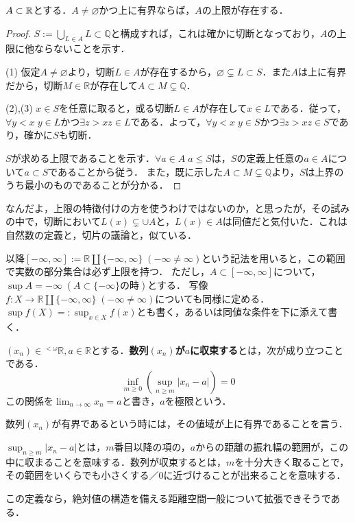 \documentclass[uplatex,dvipdfmx]{jsreport}
\begin{document}
\begin{theorem}[実数の連続性]
    $A\subset\mathbb{R}$とする．$A\ne\varnothing$かつ上に有界ならば，$A$の上限が存在する．
\end{theorem}
\begin{proof}
    $S:=\bigcup_{L\in A}L\subset\mathbb{Q}$と構成すれば，これは確かに切断となっており，$A$の上限に他ならないことを示す．

    (1) 仮定$A\ne\varnothing$より，切断$L\in A$が存在するから，$\varnothing\subsetneq L\subset S$．また$A$は上に有界だから，切断$M\in\mathbb{R}$が存在して$A\subset M\subsetneq\mathbb{Q}$．
    
    (2),(3) $x\in S$を任意に取ると，或る切断$L\in A$が存在して$x\in L$である．従って，$\forall y<x\; y\in L$かつ$\exists z>x z\in L$である．よって，$\forall y<x\; y\in S$かつ$\exists z>x z\in S$であり，確かに$S$も切断．

    $S$が求める上限であることを示す．$\forall a\in A\; a\le S$は，$S$の定義上任意の$a\in A$について$a\subset S$であることから従う．
    また，既に示した$A\subset M\subsetneq\mathbb{Q}$より，$S$は上界のうち最小のものであることが分かる．
\end{proof}
\begin{remark}
    なんだよ，上限の特徴付けの方を使うわけではないのか，と思ったが，その試みの中で，切断において$L(x)\subsetneq \cup A$と，$L(x)\in A$は同値だと気付いた．これは自然数の定義と，切片の議論と，似ている．
\end{remark}

\begin{notation}
    以降$[-\infty,\infty]:=\mathbb{R}\coprod\{-\infty,\infty\}\;(-\infty\ne\infty)$という記法を用いると，この範囲で実数の部分集合は必ず上限を持つ．
    ただし，$A\subset [-\infty,\infty]$について，$\sup A=-\infty \; (A\subset \{-\infty\}の時)$とする．
    写像$f:X\to\mathbb{R}\coprod\{-\infty,\infty\}\;(-\infty\ne\infty)$についても同様に定める．
    $\sup f(X)=:\sup_{x\in X}f(x)$とも書く，あるいは同値な条件を下に添えて書く．
\end{notation}

\begin{definition}[実数列の収束]
    $(x_n)\in{}^{<\omega}\mathbb{R},a\in\mathbb{R}$とする．\textbf{数列$(x_n)$が$a$に収束する}とは，次が成り立つことである．
    \[ \inf_{m\ge 0}\left(\sup_{n\ge m}|x_n-a|\right)=0 \]
    この関係を$\lim_{n\to\infty}x_n=a$と書き，$a$を極限という．

    数列$(x_n)$が有界であるという時には，その値域が上に有界であることを言う．
\end{definition}
\begin{remark}
    $\sup_{n\ge m}|x_n-a|$とは，$m$番目以降の項の，$a$からの距離の振れ幅の範囲が，この中に収まることを意味する．数列が収束するとは，$m$を十分大きく取ることで，その範囲をいくらでも小さくする／$0$に近づけることが出来ることを意味する．

    この定義なら，絶対値の構造を備える距離空間一般について拡張できそうである．
\end{remark}
\end{document}
